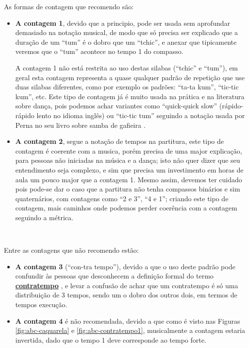 As formas de contagem que recomendo são:
\begin{itemize}
\item \textbf{A contagem 1}, 
devido que a principio, pode ser usada sem aprofundar demasiado 
na notação musical, de modo que só precisa ser explicado que a duração de um 
``tum'' é o dobro que um ``tchic'', e anexar que tipicamente veremos que o ``tum''
acontece no tempo 1 do compasso.

A contagem 1 não está restrita ao uso destas silabas (``tchic'' e ``tum''), 
em geral esta contagem representa a quase qualquer padrão de repetição
que use duas silabas diferentes, como por exemplo os padrões: ``ta-ta kum'', ``tic-tic kum'', etc. 
Este tipo de contagem já é muito usada na prática e na literatura sobre dança, pois 
podemos achar variantes como ``quick-quick slow'' (rápido-rápido lento no idioma inglês)
ou ``tic-tic tum'' seguindo a notação usada por Perna no seu livro sobre samba de gafieira \cite[pp. 146]{perna2002samba}.
\item \textbf{A contagem 2}, segue a notação de tempos na partitura, este tipo de
contagem é coerente com a musica, porém precisa de uma major explicação, 
para pessoas não iniciadas na música e a dança; isto não quer dizer que seu
entendimento seja complexo, e sim que precisa um investimento em horas de aula
um pouco major que a contagem 1.
Mesmo assim, devemos ter cuidado pois pode-se dar o caso que a partitura não tenha compassos binários 
e sim quaternários, com contagens como ``2 e 3'', ``4 e 1''; 
criando este tipo de contagem, mais caminhos onde podemos perder coerência com a contagem seguindo a métrica.
\end{itemize}~


Entre as contagens que não recomendo estão:
\begin{itemize}
\item \textbf{A contagem 3} (``con-tra tempo''), 
devido a que o uso deste padrão pode confundir às pessoas que desconhecem 
a definição formal do termo \hyperref[sec:contratempo]{\textbf{contratempo}} 
\cite[pp. 16]{mascarenhascurso} \cite[pp. 36]{azevedocompor}, 
e levar a confusão de achar que um contratempo é só uma distribuição de 3 tempos, 
sendo um o dobro dos outros dois, em termos de tempos execução.
\item \textbf{A contagem 4} é não recomendada, devido a que como é visto nas Figuras 
\ref{fig:abc-caquarela} e \ref{fig:abc-contratempo1}, musicalmente a contagem estaria invertida,
dado que o tempo 1 deve corresponde ao tempo forte.
\end{itemize}~

